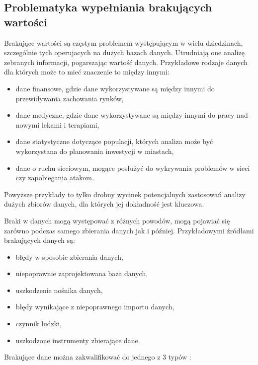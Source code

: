 \documentclass[12pt,twoside]{article}
\begin{document}
\subsection{Problematyka wypełniania brakujących wartości}

Brakujące wartości są częstym problemem występującym w wielu dziedzinach,
szczególnie tych operujacych na dużych bazach danych. Utrudniają one analizę zebranych informacji,
pogarszając wartość danych. Przykładowe rodzaje danych dla których może to mieć znaczenie to między innymi:

\begin{itemize}[label=-,labelsep=0.4cm, leftmargin=1.25cm]
    \item dane finansowe, gdzie dane wykorzystywane są między innymi do przewidywania zachowania rynków, \cite{fin}
    \item dane medyczne, gdzie dane wykorzystywane są między innymi do pracy nad nowymi lekami i terapiami, \cite{med}
    \item dane statystyczne dotyczące populacji, których analiza może być wykorzystana
          do planowania inwestycji w miastach, \cite{pop}
    \item dane o ruchu sieciowym, mogące posłużyć do wykrywania problemów w sieci czy zapobiegania atakom. \cite{net}
\end{itemize}

Powyższe przykłady to tylko drobny wycinek potencjalnych zastosowań analizy dużych zbiorów danych,
dla których jej dokładność jest kluczowa.

Braki w danych mogą występować z różnych powodów, mogą pojawiać się zarówno podczas samego zbierania danych jak i później.
Przykładowymi źródłami brakujących danych są:

\begin{itemize}[label=-,labelsep=0.4cm, leftmargin=1.25cm]
    \item błędy w sposobie zbierania danych,
    \item niepoprawnie zaprojektowana baza danych,
    \item uszkodzenie nośnika danych,
    \item błędy wynikające z niepoprawnego importu danych,
    \item czynnik ludzki,
    \item uszkodzone instrumenty zbierające dane.
\end{itemize}

Brakujące dane można zakwalifikować do jednego z 3 typów \cite{types}:
\end{document}

